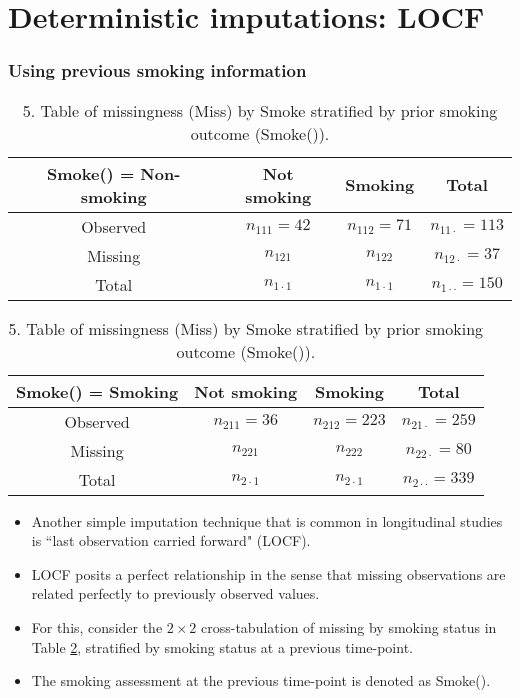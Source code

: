 \documentclass{beamer}
\begin{document}
\section{Deterministic imputations: LOCF}
\begin{frame}
\frametitle{Using previous smoking information}
\begin{table}
\caption{5. Table of missingness (Miss) by Smoke stratified by prior smoking outcome (Smoke()).}\label{tbl4}
\centering
\begin{tabular}{c|ccc}\hline
Smoke() = Non-smoking & Not smoking & Smoking & Total \\\hline
Observed & $n_{111} = 42$ & $n_{112} = 71$ & $n_{11\cdot} = 113$ \\
Missing & $n_{121}$ & $n_{122}$ & $n_{12\cdot} = 37$ \\\hline
Total  & $n_{1\cdot1}$ & $n_{1\cdot1}$ & $n_{1\cdot\cdot} = 150$\\\hline
\end{tabular}
\begin{tabular}{c|ccc}\hline
Smoke() = Smoking & Not smoking & Smoking & Total \\\hline
Observed & $n_{211} = 36$ & $n_{212} = 223$ & $n_{21\cdot} = 259$ \\
Missing & $n_{221}$ & $n_{222}$ & $n_{22\cdot} = 80$ \\\hline
Total  & $n_{2\cdot1}$ & $n_{2\cdot1}$ & $n_{2\cdot\cdot} = 339$\\\hline
\end{tabular}
\end{table}
\begin{itemize}
\item Another simple imputation technique that is common in longitudinal studies is ``last observation carried forward" (LOCF). 
\item LOCF posits a perfect relationship in the sense that missing observations are related perfectly to previously observed values.
\item For this, consider the $2\times 2$ cross-tabulation of missing by smoking status in Table \ref{tbl4}, stratified by smoking status at
a previous time-point.
\item The smoking assessment at the previous time-point is denoted as Smoke().
\end{itemize}
\end{frame}
\end{document}
